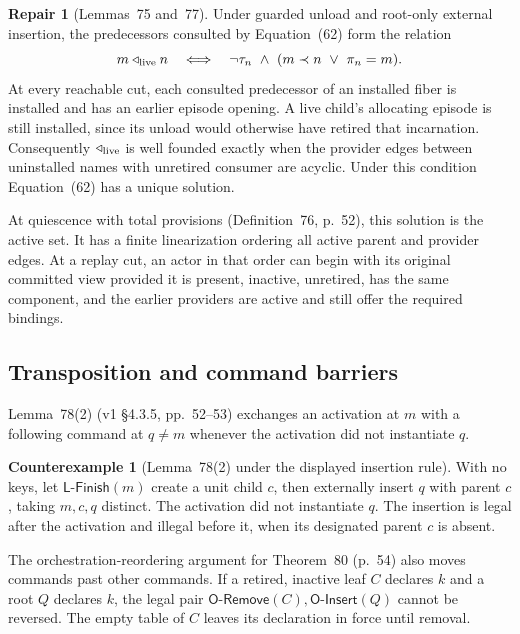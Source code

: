 \documentclass[11pt,a4paper]{article}
\theoremstyle{definition}
\newtheorem{counterexample}[definition]{Counterexample}
\newtheorem{repair}[definition]{Repair}
\theoremstyle{plain}
\newcommand{\OInsert}{\mathsf{O\text{-}Insert}}
\newcommand{\ORemove}{\mathsf{O\text{-}Remove}}
\newcommand{\LFinish}{\mathsf{L\text{-}Finish}}
\begin{document}
\begin{repair}[Lemmas~75 and~77]
Under guarded unload and root-only external insertion, the predecessors consulted by Equation~(62) form the relation
\[
  m\triangleleft_{\rm live} n
  \quad\Longleftrightarrow\quad
  \neg\tau_n\ \wedge\ (m\prec n\ \vee\ \pi_n=m).
\]
At every reachable cut, each consulted predecessor of an installed fiber is installed and has an earlier episode opening. A live child's allocating episode is still installed, since its unload would otherwise have retired that incarnation.
Consequently $\triangleleft_{\rm live}$ is well founded exactly when the provider edges between uninstalled names with unretired consumer are acyclic. Under this condition Equation~(62) has a unique solution.

At quiescence with total provisions (Definition~76, p.~52), this solution is the active set. It has a finite linearization ordering all active parent and provider edges.
At a replay cut, an actor in that order can begin with its original committed view provided it is present, inactive, unretired, has the same component, and the earlier providers are active and still offer the required bindings.
\end{repair}

\subsection{Transposition and command barriers}
\label{sec:transposition}

Lemma~78(2) (v1 \S4.3.5, pp.~52--53) exchanges an activation at $m$ with a following command at $q\ne m$ whenever the activation did not instantiate $q$.

\begin{counterexample}[Lemma~78(2) under the displayed insertion rule]
With no keys, let $\LFinish(m)$ create a unit child $c$, then externally insert $q$ with parent $c$, taking $m,c,q$ distinct. The activation did not instantiate $q$. The insertion is legal after the activation and illegal before it, when its designated parent $c$ is absent.
\end{counterexample}

The orchestration-reordering argument for Theorem~80 (p.~54) also moves commands past other commands. If a retired, inactive leaf $C$ declares $k$ and a root $Q$ declares $k$, the legal pair $\ORemove(C),\OInsert(Q)$ cannot be reversed. The empty table of $C$ leaves its declaration in force until removal.
\end{document}
